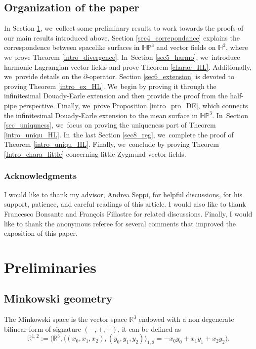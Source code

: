 \documentclass[10pt]{amsart}
\theoremstyle{plain}
\theoremstyle{definition}
\newcommand{\minko}{\mathbb{R}^{1,2}}
\newcommand{\HP}{\mathbb{HP}^3}
\newcommand{\inner}[1] {\langle #1 \rangle}
\begin{document}
\subsection{Organization of the paper}
In Section \ref{section3}, we~collect some preliminary results to work towards the proofs of our main results introduced above. Section \ref{sec4_correpondance} explains the correspondence between spacelike surfaces in \(\HP \) and vector fields on \(\mathbb{H}^2 \), where we prove Theorem \ref{intro_divergence}. In~Section \ref{sec5_harmo}, we~introduce harmonic Lagrangian vector fields and prove Theorem \ref{charac_HL}. Additionally, we~provide details on the \(\overline{\partial}\)-operator. Section \ref{sec6_extension} is devoted to proving Theorem \ref{intro_ex_HL}. We~begin by proving it through the infinitesimal Douady-Earle extension and then provide the proof from the half-pipe perspective. Finally, we~prove Proposition \ref{intro_pro_DE}, which connects the infinitesimal Douady-Earle extension to the mean surface in \(\HP \). In~Section \ref{sec_uniquness}, we~focus on proving the uniqueness part of Theorem \ref{intro_uniqu_HL}. In~the last Section \ref{sec8_reg}, we~complete the proof of Theorem \ref{intro_uniqu_HL}. Finally, we~conclude by proving Theorem \ref{Intro_chara_little} concerning little Zygmund vector fields.

\subsubsection*{Acknowledgments}

I would like to thank my advisor, Andrea Seppi, for helpful discussions, for his support, patience, and careful readings of this article. I would also like to thank Francesco Bonsante and François Fillastre for related discussions. Finally, I would like to thank the anonymous referee for several comments
that improved the exposition of this paper.


\section{Preliminaries}\label{section3}
\subsection{Minkowski geometry}
The Minkowski space is the vector space $\mathbb{R}^3$ endowed with a non degenerate bilinear form of signature $(-,+,+)$, it can be defined as
\[
\minko:=\bigl(\mathbb{R}^3, \inner{(x_0,x_1,x_2),(y_0,y_1,y_2)}_{1,2}=-x_0y_0+x_1y_1+x_2y_2\bigr).
\]
\end{document}
